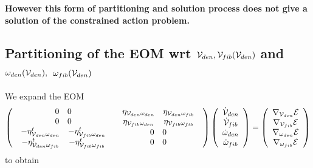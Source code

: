{\bf However this form of partitioning and solution process does not give a
solution of the constrained action problem. }

\subsection{Partitioning of the EOM wrt ${\cal V}_{den},{\cal V}_{fib}({\cal %
V}_{den})$ and $\protect\omega _{den}({\cal V}_{den}),$ $\protect\omega %
_{fib}({\cal V}_{den})$}

We expand the EOM 
\begin{equation}
\left( 
\begin{array}{cc}
\begin{array}{cc}
0 & 0 \\ 
0 & 0%
\end{array}
& 
\begin{array}{cc}
\eta _{{\cal V}_{den}\omega _{den}} & \eta _{{\cal V}_{den}\omega _{fib}} \\ 
\eta _{{\cal V}_{fib}\omega _{den}} & \eta _{{\cal V}_{fib}\omega _{fib}}%
\end{array}
\\ 
\begin{array}{cc}
-\eta _{{\cal V}_{den}\omega _{den}}^{t} & -\eta _{{\cal V}_{fib}\omega
_{den}}^{t} \\ 
-\eta _{{\cal V}_{den}\omega _{fib}}^{t} & -\eta _{{\cal V}_{fib}\omega
_{fib}}^{t}%
\end{array}
& 
\begin{array}{cc}
0 & 0 \\ 
0 & 0%
\end{array}%
\end{array}%
\right) \left( 
\begin{array}{c}
{\cal \dot{V}}_{den} \\ 
{\cal \dot{V}}_{fib} \\ 
\dot{\omega}_{den} \\ 
\dot{\omega}_{fib}%
\end{array}%
\right) =\left( 
\begin{array}{c}
\nabla _{{\cal V}_{den}}{\cal E} \\ 
\nabla _{{\cal V}_{fib}}{\cal E} \\ 
\nabla _{\omega _{den}}{\cal E} \\ 
\nabla _{\omega _{fib}}{\cal E}%
\end{array}%
\right)
\end{equation}%
to obtain 
